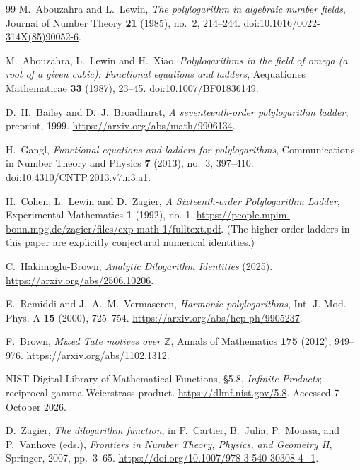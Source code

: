 \begin{thebibliography}{99}
M.~Abouzahra and L.~Lewin, \emph{The polylogarithm in algebraic number fields},
Journal of Number Theory \textbf{21} (1985), no.~2, 214--244.
\href{https://doi.org/10.1016/0022-314X(85)90052-6}{doi:10.1016/0022-314X(85)90052-6}.

M.~Abouzahra, L.~Lewin and H.~Xiao, \emph{Polylogarithms in the field of
omega (a root of a given cubic): Functional equations and ladders},
Aequationes Mathematicae \textbf{33} (1987), 23--45.
\href{https://doi.org/10.1007/BF01836149}{doi:10.1007/BF01836149}.

D.~H.~Bailey and D.~J.~Broadhurst, \emph{A seventeenth-order polylogarithm
ladder}, preprint, 1999.
\url{https://arxiv.org/abs/math/9906134}.

H.~Gangl, \emph{Functional equations and ladders for polylogarithms},
Communications in Number Theory and Physics \textbf{7} (2013), no.~3, 397--410.
\href{https://doi.org/10.4310/CNTP.2013.v7.n3.a1}{doi:10.4310/CNTP.2013.v7.n3.a1}.

H.~Cohen, L.~Lewin and D.~Zagier, \emph{A Sixteenth-order Polylogarithm Ladder},
Experimental Mathematics \textbf{1} (1992), no. 1.
\url{https://people.mpim-bonn.mpg.de/zagier/files/exp-math-1/fulltext.pdf}.
(The higher-order ladders in this paper are explicitly conjectural numerical identities.)

C.~Hakimoglu-Brown, \emph{Analytic Dilogarithm Identities} (2025).
\url{https://arxiv.org/abs/2506.10206}.

E.~Remiddi and J.~A.~M.~Vermaseren, \emph{Harmonic polylogarithms},
Int. J. Mod. Phys. A \textbf{15} (2000), 725--754.
\url{https://arxiv.org/abs/hep-ph/9905237}.

F.~Brown, \emph{Mixed Tate motives over $\mathbb Z$},
Annals of Mathematics \textbf{175} (2012), 949--976.
\url{https://arxiv.org/abs/1102.1312}.

NIST Digital Library of Mathematical Functions, \S5.8, \emph{Infinite Products}; reciprocal-gamma Weierstrass product. \url{https://dlmf.nist.gov/5.8}. Accessed 7 October 2026.

D.~Zagier,
\emph{The dilogarithm function},
in P.~Cartier, B.~Julia, P.~Moussa, and P.~Vanhove (eds.),
\emph{Frontiers in Number Theory, Physics, and Geometry II},
Springer, 2007, pp.~3--65.
\url{https://doi.org/10.1007/978-3-540-30308-4_1}.


\end{thebibliography}

